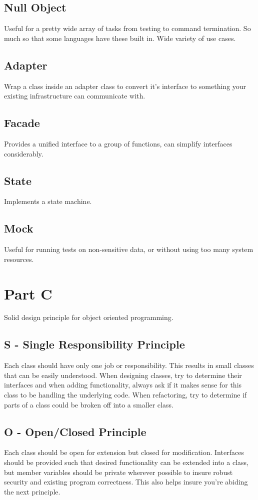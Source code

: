 \documentclass{article}
\begin{document}
    \subsection*{Null Object}
    Useful for a pretty wide array of tasks from testing to command termination. So much so that some languages have these built in. Wide variety of use cases.
    \subsection*{Adapter}
    Wrap a class inside an adapter class to convert it's interface to something your existing infrastructure can communicate with.
    \subsection*{Facade}
    Provides a unified interface to a group of functions, can simplify interfaces considerably.
    \subsection*{State}
    Implements a state machine.
    \subsection*{Mock}
    Useful for running tests on non-sensitive data, or without using too many system resources.


  \section*{Part C}
    Solid design principle for object oriented programming. 
    \subsection*{S - Single Responsibility Principle}
    Each class should have only one job or responsibility. This results in small classes that can be easily understood. When designing classes, try to determine their interfaces and when adding functionality, always ask if it makes sense for this class to be handling the underlying code. When refactoring, try to determine if parts of a class could be broken off into a smaller class.

    \subsection*{O - Open/Closed Principle}
    Each class should be open for extension but closed for modification. Interfaces should be provided such that desired functionality can be extended into a class, but member variables should be private wherever possible to insure robust security and existing program correctness. This also helps insure you're abiding the next principle.
\end{document}
